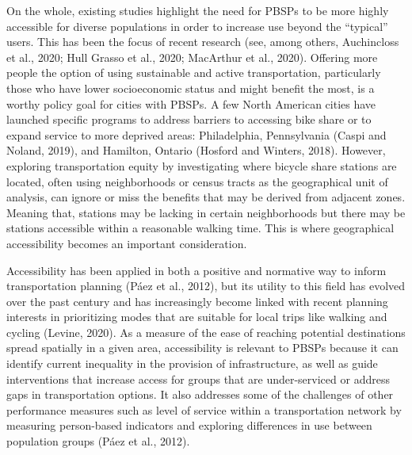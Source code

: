 \documentclass[]{elsarticle} %
\begin{document}
On the whole, existing studies highlight the need for PBSPs to be more
highly accessible for diverse populations in order to increase use
beyond the ``typical'' users. This has been the focus of recent research
(see, among others, Auchincloss et al., 2020; Hull Grasso et al., 2020;
MacArthur et al., 2020). Offering more people the option of using
sustainable and active transportation, particularly those who have lower
socioeconomic status and might benefit the most, is a worthy policy goal
for cities with PBSPs. A few North American cities have launched
specific programs to address barriers to accessing bike share or to
expand service to more deprived areas: Philadelphia, Pennsylvania (Caspi
and Noland, 2019), and Hamilton, Ontario (Hosford and Winters, 2018).
However, exploring transportation equity by investigating where bicycle
share stations are located, often using neighborhoods or census tracts
as the geographical unit of analysis, can ignore or miss the benefits
that may be derived from adjacent zones. Meaning that, stations may be
lacking in certain neighborhoods but there may be stations accessible
within a reasonable walking time. This is where geographical
accessibility becomes an important consideration.

Accessibility has been applied in both a positive and normative way to
inform transportation planning (Páez et al., 2012), but its utility to
this field has evolved over the past century and has increasingly become
linked with recent planning interests in prioritizing modes that are
suitable for local trips like walking and cycling (Levine, 2020). As a
measure of the ease of reaching potential destinations spread spatially
in a given area, accessibility is relevant to PBSPs because it can
identify current inequality in the provision of infrastructure, as well
as guide interventions that increase access for groups that are
under-serviced or address gaps in transportation options. It also
addresses some of the challenges of other performance measures such as
level of service within a transportation network by measuring
person-based indicators and exploring differences in use between
population groups (Páez et al., 2012).
\end{document}
